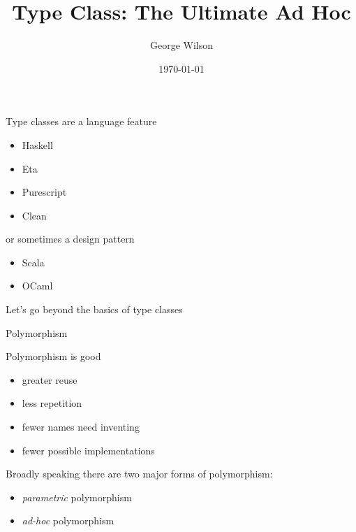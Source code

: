 \documentclass[usenames,dvipsnames,svgnames,table,aspectratio=169,mathserif]{beamer}
\title[Type Class: The Ultimate Ad Hoc]{Type Class: The Ultimate Ad Hoc} %
\author{George Wilson} %
\institute[] %
{
Data61/CSIRO\\ %
\medskip
\href{george.wilson@data61.csiro.au}{george.wilson@data61.csiro.au} %
}
\date{\today} %
\begin{document}


\begin{frame}
\titlepage %
\end{frame}


\begin{frame}

Type classes are a language feature

\begin{itemize}
\item Haskell
\item Eta
\item Purescript
\item Clean
\end{itemize}

\pause

or sometimes a design pattern

\begin{itemize}
\item Scala
\item OCaml
\end{itemize}

\end{frame}


\begin{frame}
Let's go beyond the basics of type classes
\end{frame}




\begin{frame}
\begin{center}
\huge{Polymorphism}
\end{center}
\end{frame}


\begin{frame}
\begin{center}
Polymorphism is good


\begin{itemize}
\item greater reuse
\item less repetition
\item fewer names need inventing
\item fewer possible implementations
\end{itemize}
\end{center}
\end{frame}


\begin{frame}
Broadly speaking there are two major forms of polymorphism:

\begin{itemize}
\item {\it parametric} polymorphism
\item {\it ad-hoc} polymorphism
\end{itemize}
\end{frame}
\end{document}
